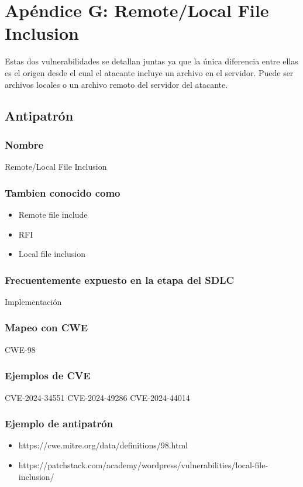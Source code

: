 \chapter{Apéndice G: Remote/Local File Inclusion}

Estas dos vulnerabilidades se detallan juntas ya que la única diferencia entre ellas es el origen desde el cual el atacante incluye un archivo en el servidor. Puede ser archivos locales o un archivo remoto del servidor del atacante. 

\section{Antipatrón}
\subsection{Nombre}
Remote/Local File Inclusion
\subsection{Tambien conocido como}
\begin{itemize}
    \item Remote file include
    \item RFI
    \item Local file inclusion
\end{itemize}
\subsection{Frecuentemente expuesto en la etapa del SDLC}
Implementación
\subsection{Mapeo con CWE}
CWE-98
\subsection{Ejemplos de CVE}
CVE-2024-34551 
CVE-2024-49286 
CVE-2024-44014 
\subsection{Ejemplo de antipatrón}

\begin{itemize}
    \item https://cwe.mitre.org/data/definitions/98.html
    \item https://patchstack.com/academy/wordpress/vulnerabilities/local-file-inclusion/
\end{itemize}


